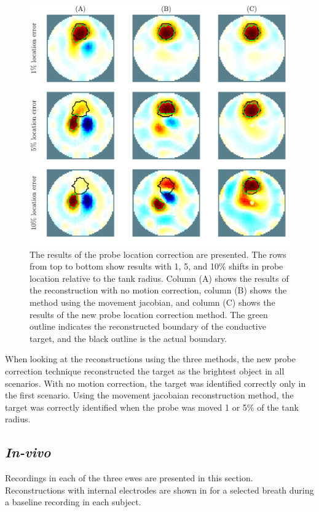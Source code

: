 \begin{figure}[H]
    \centering
	\includegraphics[width=\textwidth]{chapter7-internal_elec_motion/imgs/recon_accuracy_hollow.pdf} 
	\caption[Results of the probe location correction]{\label{fig:probe_location_correction} 
	The results of the probe location correction are presented. 
	The rows from top to bottom show results with 1, 5, and 10\% shifts in probe location 
	relative to the tank radius.
	Column (A) shows the results of the reconstruction  with no motion correction,
	column (B) shows the method using the movement jacobian, and 
	column (C) shows the results of the new probe location correction method.
	The green outline indicates the reconstructed boundary of the conductive target, 
	and the black outline is the actual boundary.}
\end{figure}

When looking at the reconstructions using the three methods, the new probe correction technique
reconstructed the target as the brightest object in all scenarios. With no motion correction, the 
target was identified correctly only in the first scenario. Using the movement jacobaian 
reconstruction method, the target was correctly identified when the probe was moved 1 or 5\%
of the tank radius. 

\subsection{\emph{In-vivo}}
Recordings in each of the three ewes are presented in this section.
Reconstructions with internal electrodes are shown in
 for a selected breath during a 
baseline recording in each subject.

